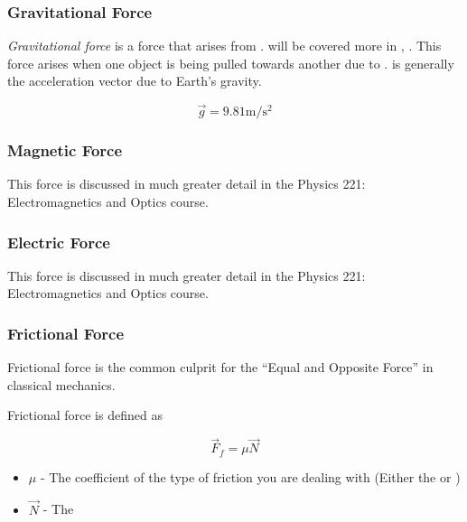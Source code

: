 \subsubsection{Gravitational Force}\label{subsubsec:Gravitational Force}
\begin{definition}\label{def:Gravitational Force}
  \emph{Gravitational force} is a force that arises from .
   will be covered more in , .
  This force arises when one object is being pulled towards another due to .
   is generally the acceleration vector due to Earth's gravity.

  \begin{equation}\label{eq:Gravitational Force}
    \vec{g} = 9.81 \si{\meter / \second^{2}}
  \end{equation}
\end{definition}

\subsubsection{Magnetic Force}\label{subsubsec:Magnetic Force}
This force is discussed in much greater detail in the Physics 221: Electromagnetics and Optics course.

\subsubsection{Electric Force}\label{subsubsec:Electric Force}
This force is discussed in much greater detail in the Physics 221: Electromagnetics and Optics course.

\subsubsection{Frictional Force}\label{subsubsec:Frictional Force}
Frictional force is the common culprit for the ``Equal and Opposite Force'' in classical mechanics.

\begin{definition}\label{def:Frictional Force}
  Frictional force is defined as

  \begin{equation}\label{eq:Frictional Force}
    \vec{F}_{f} = \mu \vec{N}
  \end{equation}
  \begin{itemize}[noitemsep, nolistsep]
    \item $\mu$ - The coefficient of the type of friction you are dealing with (Either the  or )
    \item $\vec{N}$ - The 
  \end{itemize}
\end{definition}

